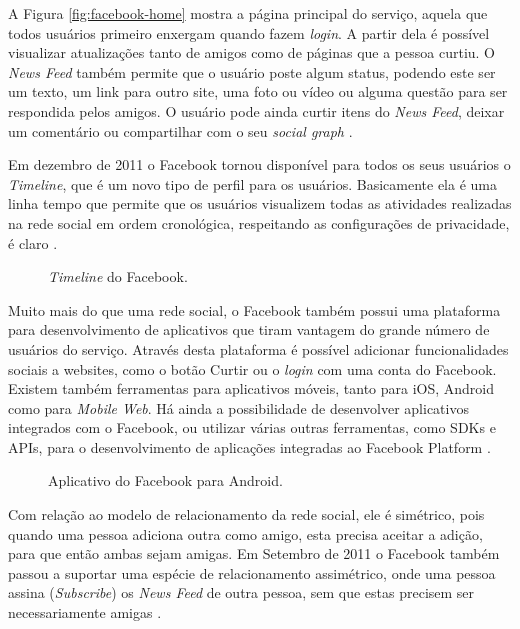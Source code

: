 \documentclass[diss]{template/setrem}
\begin{document}
A Figura \ref{fig:facebook-home} mostra a página principal do serviço, aquela que todos usuários primeiro enxergam quando fazem \emph{login}. A partir dela é possível visualizar atualizações tanto de amigos como de páginas que a pessoa curtiu. O \emph{News Feed} também permite que o usuário poste algum status, podendo este ser um texto, um link para outro site, uma foto ou vídeo ou alguma questão para ser respondida pelos amigos. O usuário pode ainda curtir itens do \emph{News Feed}, deixar um comentário ou compartilhar com o seu \emph{social graph} \citep{Facebook2012a}.

Em dezembro de 2011 o Facebook tornou disponível para todos os seus usuários o \emph{Timeline}, que é um novo tipo de perfil para os usuários. Basicamente ela é uma linha tempo que permite que os usuários visualizem todas as atividades realizadas na rede social em ordem cronológica, respeitando as configurações de privacidade, é claro \citep{McDonald2011}.

\begin{figure}[!h]
    \caption{\emph{Timeline} do Facebook.}
    \label{fig:facebook-timeline}
\end{figure}

Muito mais do que uma rede social, o Facebook também possui uma plataforma para desenvolvimento de aplicativos que tiram vantagem do grande número de usuários do serviço. Através desta plataforma é possível adicionar funcionalidades sociais a websites, como o botão Curtir ou o \emph{login} com uma conta do Facebook. Existem também ferramentas para aplicativos móveis, tanto para iOS, Android como para \emph{Mobile Web}. Há ainda a possibilidade de desenvolver aplicativos integrados com o Facebook, ou utilizar várias outras ferramentas, como SDKs e APIs, para o desenvolvimento de aplicações integradas ao Facebook Platform \citep{Facebook2012c}.

\begin{figure}[!h]
    \caption{Aplicativo do Facebook para Android.}
    \label{fig:facebook-android}
\end{figure}

Com relação ao modelo de relacionamento da rede social, ele é simétrico, pois quando uma pessoa adiciona outra como amigo, esta precisa aceitar a adição, para que então ambas sejam amigas. Em Setembro de 2011 o Facebook também passou a suportar uma espécie de relacionamento assimétrico, onde uma pessoa assina (\emph{Subscribe}) os \emph{News Feed} de outra pessoa, sem que estas precisem ser necessariamente amigas \citep{Rait2011}.
\end{document}
